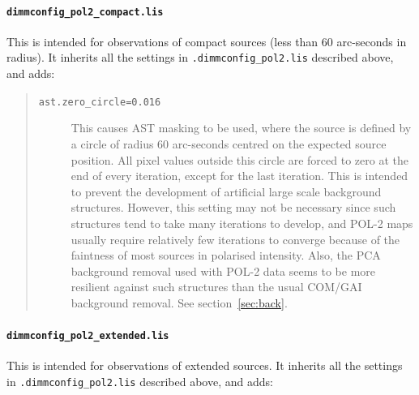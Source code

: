 \documentclass[twoside,11pt]{starlink}
\begin{document}
\paragraph{\texttt{dimmconfig\_pol2\_compact.lis}}
This is intended for observations of compact sources (less than 60
arc-seconds in radius). It inherits all the settings in
\texttt{.dimmconfig\_pol2.lis} described above, and adds:

\begin{quote}
\begin{description}

\item[\texttt{ast.zero\_circle=0.016}] This causes AST masking to be used,
where the source is defined by a circle of radius 60 arc-seconds centred
on the expected source position. All pixel values outside this circle are
forced to zero at the end of every iteration, except for the last
iteration. This is intended to prevent the development of artificial
large scale background structures. However, this setting may not be
necessary since such structures tend to take many iterations to develop,
and POL-2 maps usually require relatively few iterations to converge
because of the faintness of most sources in polarised intensity.
Also, the PCA background removal used with POL-2 data seems to be more
resilient against such structures than the usual COM/GAI background
removal. See section~\ref{sec:back}.

\end{description}
\end{quote}

\paragraph{\texttt{dimmconfig\_pol2\_extended.lis}}
This is intended for observations of extended sources. It inherits all the
settings in \texttt{.dimmconfig\_pol2.lis} described above, and adds:
\end{document}
